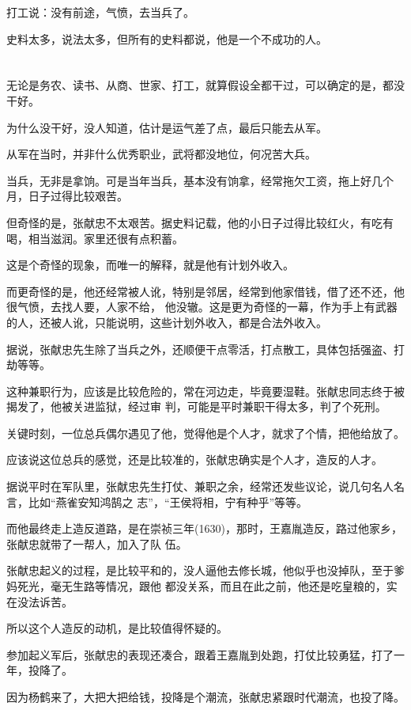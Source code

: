\documentclass[11pt,a4paper,onecolumn]{article}
\begin{document}
打工说：没有前途，气愤，去当兵了。

史料太多，说法太多，但所有的史料都说，他是一个不成功的人。

\section[\thesection]{}

无论是务农、读书、从商、世家、打工，就算假设全都干过，可以确定的是，都没干好。

为什么没干好，没人知道，估计是运气差了点，最后只能去从军。

从军在当时，并非什么优秀职业，武将都没地位，何况苦大兵。

当兵，无非是拿饷。可是当年当兵，基本没有饷拿，经常拖欠工资，拖上好几个月，日子过得比较艰苦。

但奇怪的是，张献忠不太艰苦。据史料记载，他的小日子过得比较红火，有吃有喝，相当滋润。家里还很有点积蓄。

这是个奇怪的现象，而唯一的解释，就是他有计划外收入。

而更奇怪的是，他还经常被人讹，特别是邻居，经常到他家借钱，借了还不还，他很气愤，去找人要，人家不给，
他没辙。这是更为奇怪的一幕，作为手上有武器的人，还被人讹，只能说明，这些计划外收入，都是合法外收入。

据说，张献忠先生除了当兵之外，还顺便干点零活，打点散工，具体包括强盗、打劫等等。

这种兼职行为，应该是比较危险的，常在河边走，毕竟要湿鞋。张献忠同志终于被揭发了，他被关进监狱，经过审
判，可能是平时兼职干得太多，判了个死刑。

关键时刻，一位总兵偶尔遇见了他，觉得他是个人才，就求了个情，把他给放了。

应该说这位总兵的感觉，还是比较准的，张献忠确实是个人才，造反的人才。

据说平时在军队里，张献忠先生打仗、兼职之余，经常还发些议论，说几句名人名言，比如``燕雀安知鸿鹄之
志''，``王侯将相，宁有种乎''等等。

而他最终走上造反道路，是在崇祯三年(1630)，那时，王嘉胤造反，路过他家乡，张献忠就带了一帮人，加入了队
伍。

张献忠起义的过程，是比较平和的，没人逼他去修长城，他似乎也没掉队，至于爹妈死光，毫无生路等情况，跟他
都没关系，而且在此之前，他还是吃皇粮的，实在没法诉苦。

所以这个人造反的动机，是比较值得怀疑的。

参加起义军后，张献忠的表现还凑合，跟着王嘉胤到处跑，打仗比较勇猛，打了一年，投降了。

因为杨鹤来了，大把大把给钱，投降是个潮流，张献忠紧跟时代潮流，也投了降。
\end{document}
